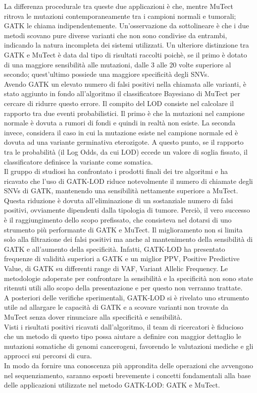 La differenza procedurale tra queste due applicazioni è che, mentre MuTect ritrova le mutazioni contemporaneamente tra i campioni normali e tumorali; GATK le chiama indipendentemente. Un'osservazione da sottolineare è che i due metodi scovano pure diverse varianti che non sono condivise da entrambi, indicando la natura incompleta dei sistemi utilizzati. Un ulteriore distinzione tra GATK e MuTect è data dal tipo di risultati raccolti poichè, se il primo è dotato di una maggiore sensibilità alle mutazioni, dalle 3 alle 20 volte superiore al secondo; quest'ultimo possiede una maggiore specificità degli SNVs. \\ 
Avendo GATK un elevato numero di falsi positivi nella chiamata alle varianti, è stato aggiunto in fondo all'algoritmo il classificatore Bayesiano di MuTect per cercare di ridurre questo errore. Il compito del LOD consiste nel calcolare il rapporto tra due eventi probabilistici. Il primo è che la mutazioni nel campione normale è dovuta a rumori di fondi e quindi in realtà non esiste. La seconda invece, considera il caso in cui la mutazione esiste nel campione normale ed è dovuta ad una variante germinativa eterozigote. A questo punto, se il rapporto tra le probabilità (il Log Odds, da cui LOD) eccede un valore di soglia fissato, il classificatore definisce la variante come somatica.\\
Il gruppo di studiosi ha confrontato i prodotti finali dei tre algoritmi e ha ricavato che l'uso di GATK-LOD riduce notevolmente il numero di chiamate degli SNVs di GATK, mantenendo una sensibilità nettamente superiore a MuTect. Questa riduzione è dovuta all'eliminazione di un sostanziale numero di falsi positivi, ovviamente dipendenti dalla tipologia di tumore. Perciò, il vero successo è il raggiungimento dello scopo prefissato, che consisteva nel dotarsi di uno strumento più performante di GATK e MuTect. Il miglioramento non si limita solo alla filtrazione dei falsi positivi ma anche al mantenimento della sensibilità di GATK e all'aumento della specificità. Infatti, GATK-LOD ha presentato frequenze di validità superiori a GATK e un miglior PPV, Positive Predictive Value, di GATK su differenti range di VAF, Variant Allelic Frequency. Le metodologie adoperate per confrontare la sensibilità e la specificità non sono state ritenuti utili allo scopo della presentazione e per questo non verranno trattate. \\      
A posteriori delle verifiche sperimentali, GATK-LOD si è rivelato uno strumento utile ad allargare le capacità di GATK e a scovare varianti non trovate da MuTect senza dover rinunciare alla specificità e sensibilità. \\
Visti i risultati positivi ricavati dall'algoritmo, il team di ricercatori è fiducioso che un metodo di questo tipo possa aiutare a definire con maggior dettaglio le mutazioni somatiche di genomi cancerogeni, favorendo le valutazioni mediche e gli approcci sui percorsi di cura. \\
In modo da fornire una conoscenza più approndita delle operazioni che avvengono nel sequenziamento, saranno esposti brevemente i concetti fondamentali alla base delle applicazioni utilizzate nel metodo GATK-LOD: GATK e MuTect.   

